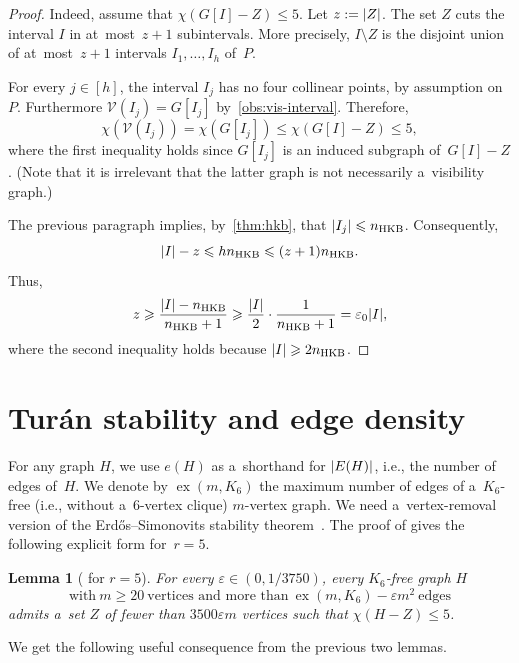 \documentclass[11pt,a4paper]{article}
\newtheorem{lemma}{Lemma}
\newcommand{\vis}{\mathcal V}
\newcommand{\hkb}{n_{\mathrm{HKB}}}
\DeclareMathOperator{\ex}{ex}
\begin{document}
\begin{proof}
  Indeed, assume that $\chi(G[I]-Z) \leqslant 5$.
  Let $z := \mathopen| Z \mathclose|$.
  The set $Z$ cuts the interval $I$ in at~most~$z+1$ subintervals.
  More precisely, $I \setminus Z$ is the disjoint union of at~most~$z+1$ intervals $I_1, \ldots, I_h$ of~$P$.

  For every $j \in [h]$, the interval $I_j$ has no four collinear points, by assumption on~$P$.
  Furthermore $\vis(I_j) = G[I_j]$ by~\cref{obs:vis-interval}.
  Therefore, \[\chi(\vis(I_j)) = \chi(G[I_j]) \leqslant \chi(G[I]-Z) \leqslant 5,\]
  where the first inequality holds since $G[I_j]$ is an induced subgraph of~$G[I]-Z$.
  (Note that it is irrelevant that the latter graph is not necessarily a~visibility graph.)

  The previous paragraph implies, by~\cref{thm:hkb}, that $\abs{I_j} \leqslant \hkb$.
  Consequently, \[\abs{I} - z \leqslant h \hkb \leqslant (z+1) \hkb.\]
  Thus, \[z \geqslant \frac{\abs{I} - \hkb}{\hkb+1} \geqslant \frac{\abs{I}}{2} \cdot \frac{1}{\hkb+1} = \varepsilon_0 \abs{I},\]
  where the second inequality holds because $\abs{I} \geqslant 2 \hkb$.
\end{proof}

\section{Turán stability and edge density}

For any graph $H$, we use $e(H)$ as a~shorthand for $\mathopen| E(H) \mathclose|$, i.e., the number of edges of~$H$.
We denote by $\ex(m,K_6)$ the maximum number of edges of a~$K_6$-free (i.e., without a~6-vertex clique) $m$-vertex graph.  
We need a~vertex-removal version of the Erd\H{o}s--Simonovits stability theorem~\cite{Erdos66,Erdos67,Simonovits68}.
The proof of \cite[Lemma 2.3]{Popielarz18} gives the following explicit form for~$r=5$.

\begin{lemma}[{\cite[Lemma 2.3]{Popielarz18}} for $r=5$]\label{lem:turan-stab}
  For every $\varepsilon \in (0,1/3750)$, every $K_6$-free graph $H$ 
  \[\text{with}~m \geqslant 20~\text{vertices and more than}~\ex(m,K_6)-\varepsilon m^2~\text{edges}\]
  admits a~set $Z$ of fewer than $3500 \varepsilon m$ vertices such that $\chi(H-Z) \leqslant 5$. 
\end{lemma}

We get the following useful consequence from the previous two lemmas.
\end{document}
